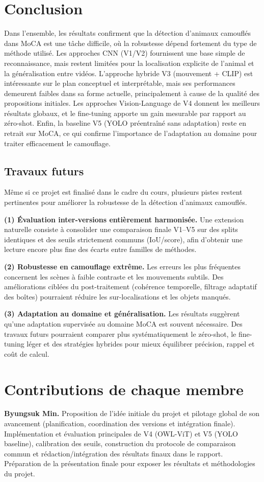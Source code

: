 \documentclass{article}
\begin{document}
\section{Conclusion}
Dans l’ensemble, les résultats confirment que la détection d’animaux camouflés dans MoCA est une tâche difficile, où la robustesse dépend fortement du type de méthode utilisé. Les approches CNN (V1/V2) fournissent une base simple de reconnaissance, mais restent limitées pour la localisation explicite de l’animal et la généralisation entre vidéos. L’approche hybride V3 (mouvement + CLIP) est intéressante sur le plan conceptuel et interprétable, mais ses performances demeurent faibles dans sa forme actuelle, principalement à cause de la qualité des propositions initiales. Les approches Vision-Language de V4 donnent les meilleurs résultats globaux, et le fine-tuning apporte un gain mesurable par rapport au zéro-shot. Enfin, la baseline V5 (YOLO préentraîné sans adaptation) reste en retrait sur MoCA, ce qui confirme l’importance de l’adaptation au domaine pour traiter efficacement le camouflage.

\subsection{Travaux futurs}
Même si ce projet est finalisé dans le cadre du cours, plusieurs pistes restent pertinentes pour améliorer la robustesse de la détection d’animaux camouflés.

\textbf{(1) Évaluation inter-versions entièrement harmonisée.}
Une extension naturelle consiste à consolider une comparaison finale V1--V5 sur des splits identiques et des seuils strictement communs (IoU/score), afin d’obtenir une lecture encore plus fine des écarts entre familles de méthodes.

\textbf{(2) Robustesse en camouflage extrême.}
Les erreurs les plus fréquentes concernent les scènes à faible contraste et les mouvements subtils. Des améliorations ciblées du post-traitement (cohérence temporelle, filtrage adaptatif des boîtes) pourraient réduire les sur-localisations et les objets manqués.

\textbf{(3) Adaptation au domaine et généralisation.}
Les résultats suggèrent qu’une adaptation supervisée au domaine MoCA est souvent nécessaire. Des travaux futurs pourraient comparer plus systématiquement le zéro-shot, le fine-tuning léger et des stratégies hybrides pour mieux équilibrer précision, rappel et coût de calcul.

\section*{Contributions de chaque membre}
\textbf{Byungsuk Min.} Proposition de l’idée initiale du projet et pilotage global de son avancement (planification, coordination des versions et intégration finale). Implémentation et évaluation principales de V4 (OWL-ViT) et V5 (YOLO baseline), calibration des seuils, construction du protocole de comparaison commun et rédaction/intégration des résultats finaux dans le rapport. Préparation de la présentation finale pour exposer les résultats et méthodologies du projet.
\end{document}
